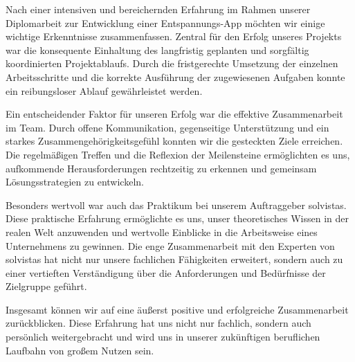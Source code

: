 
Nach einer intensiven und bereichernden Erfahrung im Rahmen unserer Diplomarbeit zur Entwicklung einer Entspannungs-App 
möchten wir einige wichtige Erkenntnisse zusammenfassen. Zentral für den Erfolg unseres Projekts war die konsequente 
Einhaltung des langfristig geplanten und sorgfältig koordinierten Projektablaufs. Durch die fristgerechte Umsetzung 
der einzelnen Arbeitsschritte und die korrekte Ausführung der zugewiesenen Aufgaben konnte ein reibungsloser Ablauf 
gewährleistet werden.

Ein entscheidender Faktor für unseren Erfolg war die effektive Zusammenarbeit im Team. Durch offene Kommunikation, 
gegenseitige Unterstützung und ein starkes Zusammengehörigkeitsgefühl konnten wir die gesteckten Ziele erreichen. 
Die regelmäßigen Treffen und die Reflexion der Meilensteine ermöglichten es uns, aufkommende 
Herausforderungen rechtzeitig zu erkennen und gemeinsam Lösungsstrategien zu entwickeln.

Besonders wertvoll war auch das Praktikum bei unserem Auftraggeber solvistas. Diese praktische Erfahrung ermöglichte 
es uns, unser theoretisches Wissen in der realen Welt anzuwenden und wertvolle Einblicke in die Arbeitsweise eines 
Unternehmens zu gewinnen. Die enge Zusammenarbeit mit den Experten von solvistas hat nicht nur unsere fachlichen 
Fähigkeiten erweitert, sondern auch zu einer vertieften Verständigung über die Anforderungen und Bedürfnisse 
der Zielgruppe geführt.

Insgesamt können wir auf eine äußerst positive und erfolgreiche Zusammenarbeit zurückblicken. 
Diese Erfahrung hat uns nicht nur fachlich, sondern auch persönlich weitergebracht 
und wird uns in unserer zukünftigen beruflichen Laufbahn von großem Nutzen sein.